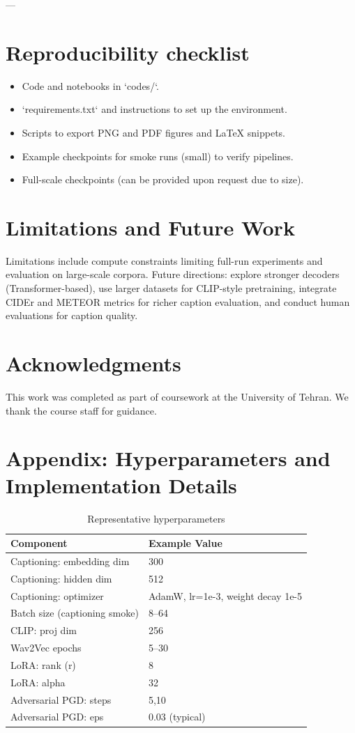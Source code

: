 \documentclass[conference]{IEEEtran}
\begin{document}
---
\fi

\section{Reproducibility checklist}\label{sec:repro}
\begin{itemize}
  \item [\checkmark] Code and notebooks in `codes/`.
  \item [\checkmark] `requirements.txt` and instructions to set up the environment.
  \item [\checkmark] Scripts to export PNG and PDF figures and LaTeX snippets.
  \item [\checkmark] Example checkpoints for smoke runs (small) to verify pipelines.
  \item [\_ ] Full-scale checkpoints (can be provided upon request due to size).
\end{itemize}

\section{Limitations and Future Work}
Limitations include compute constraints limiting full-run experiments and evaluation on large-scale corpora. Future directions: explore stronger decoders (Transformer-based), use larger datasets for CLIP-style pretraining, integrate CIDEr and METEOR metrics for richer caption evaluation, and conduct human evaluations for caption quality.

\section*{Acknowledgments}
This work was completed as part of coursework at the University of Tehran. We thank the course staff for guidance.

\appendices
\section{Appendix: Hyperparameters and Implementation Details}\label{appendix:hyper}
\begin{table}[h]
\centering
\caption{Representative hyperparameters}
\begin{tabular}{l l}
\toprule
Component & Example Value \\
\midrule
Captioning: embedding dim & 300 \\
Captioning: hidden dim & 512 \\
Captioning: optimizer & AdamW, lr=1e-3, weight decay 1e-5 \\
Batch size (captioning smoke) & 8--64 \\
CLIP: proj dim & 256 \\
Wav2Vec epochs & 5--30 \\
LoRA: rank (r) & 8 \\
LoRA: alpha & 32 \\
Adversarial PGD: steps & 5,10 \\
Adversarial PGD: eps & 0.03 (typical) \\
\bottomrule
\end{tabular}
\end{table}
\end{document}
